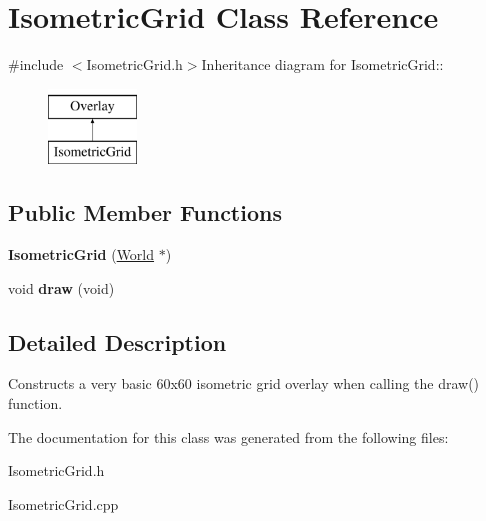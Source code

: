 \hypertarget{classIsometricGrid}{
\section{IsometricGrid Class Reference}
\label{classIsometricGrid}
}


{\ttfamily \#include $<$IsometricGrid.h$>$}Inheritance diagram for IsometricGrid::\begin{figure}[H]
\begin{center}
\leavevmode
\includegraphics[height=2cm]{classIsometricGrid}
\end{center}
\end{figure}
\subsection*{Public Member Functions}
\begin{DoxyCompactItemize}
\item 
\hypertarget{classIsometricGrid_a4ac39773481a3937b415a71e8e7a29bd}{
{\bfseries IsometricGrid} (\hyperlink{classWorld}{World} $\ast$)}
\label{classIsometricGrid_a4ac39773481a3937b415a71e8e7a29bd}

\item 
\hypertarget{classIsometricGrid_a3138024ea901361f87a47c008fe4f31d}{
void {\bfseries draw} (void)}
\label{classIsometricGrid_a3138024ea901361f87a47c008fe4f31d}

\end{DoxyCompactItemize}


\subsection{Detailed Description}
Constructs a very basic 60x60 isometric grid overlay when calling the draw() function. 

The documentation for this class was generated from the following files:\begin{DoxyCompactItemize}
\item 
IsometricGrid.h\item 
IsometricGrid.cpp\end{DoxyCompactItemize}
